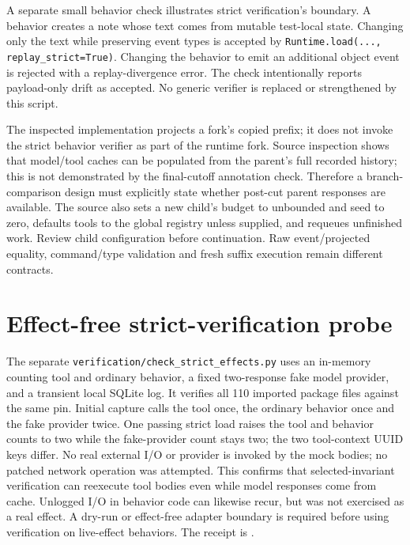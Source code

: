 \documentclass[11pt]{article}
\begin{document}
A separate small behavior check illustrates strict verification's boundary. A behavior creates a note whose text comes from mutable test-local state. Changing only the text while preserving event types is accepted by \texttt{Runtime.load(..., replay\_strict=True)}. Changing the behavior to emit an additional object event is rejected with a replay-divergence error. The check intentionally reports payload-only drift as accepted. No generic verifier is replaced or strengthened by this script.

The inspected implementation projects a fork's copied prefix; it does not invoke the strict behavior verifier as part of the runtime fork. Source inspection shows that model/tool caches can be populated from the parent's full recorded history; this is not demonstrated by the final-cutoff annotation check. Therefore a branch-comparison design must explicitly state whether post-cut parent responses are available. The source also sets a new child's budget to unbounded and seed to zero, defaults tools to the global registry unless supplied, and requeues unfinished work. Review child configuration before continuation. Raw event/projected equality, command/type validation and fresh suffix execution remain different contracts.

\section*{Effect-free strict-verification probe}
The separate \texttt{verification/check\_strict\_effects.py} uses an in-memory counting tool and ordinary behavior, a fixed two-response fake model provider, and a transient local SQLite log. It verifies all 110 imported package files against the same pin. Initial capture calls the tool once, the ordinary behavior once and the fake provider twice. One passing strict load raises the tool and behavior counts to two while the fake-provider count stays two; the two tool-context UUID keys differ. No real external I/O or provider is invoked by the mock bodies; no patched network operation was attempted. This confirms that selected-invariant verification can reexecute tool bodies even while model responses come from cache. Unlogged I/O in behavior code can likewise recur, but was not exercised as a real effect. A dry-run or effect-free adapter boundary is required before using verification on live-effect behaviors. The receipt is .
\end{document}

